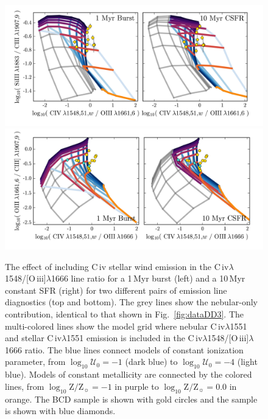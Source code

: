 \documentclass[preprint2,trackchanges]{aastex62}
\newcommand{\oiii}{[O\,{\sc iii}]\xspace}
\newcommand{\civ}{C\,{\sc iv}\xspace}
\newcommand{\Myr}{$\,$Myr\xspace}
\newcommand{\logten}{\ensuremath{\log_{10}}}
\newcommand{\logZeq}[1]{\ensuremath{\logten \mathrm{Z}/\mathrm{Z}_{\sun} = #1}}
\newcommand{\logUeq}[1]{\ensuremath{\logten \mathcal{U}_0 = #1}}
\begin{document}
\begin{figure}
  \begin{center}
    \includegraphics[width=0.98\linewidth]{figs/f17ab.png}\\
    \includegraphics[width=0.98\linewidth]{figs/f17cd.png}
    \caption{The effect of including \civ stellar wind emission in the \civ$\lambda$1548/\oiii$\lambda$1666 line ratio for a 1\Myr burst (left) and a 10\Myr constant SFR (right) for two different pairs of emission line diagnostics (top and bottom). The grey lines show the nebular-only contribution, identical to that shown in Fig.~\ref{fig:dataDD3}. The multi-colored lines show the model grid where nebular \civ$\lambda$1551 and stellar \civ$\lambda$1551 emission is included in the \civ$\lambda$1548/\oiii$\lambda$1666 ratio. The blue lines connect models of constant ionization parameter, from \logUeq{-1} (dark blue) to \logUeq{-4} (light blue). Models of constant metallicity are connected by the colored lines, from \logZeq{-1} in purple to \logZeq{0.0} in orange. The \citet{Berg+2016} BCD sample is shown with gold circles and the \citet{Senchyna+2017} sample is shown with blue diamonds.}
    \label{fig:CIVgrid}
  \end{center}
\end{figure}
\end{document}
